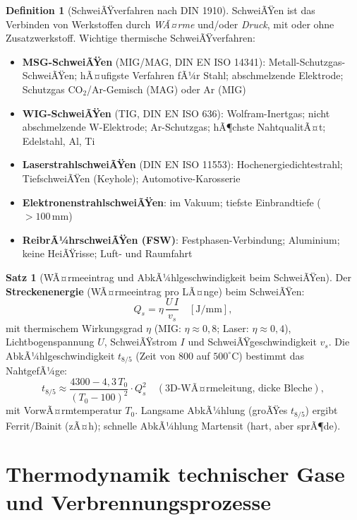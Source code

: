 ﻿\documentclass[a4paper,12pt]{report}
\theoremstyle{definition}
\newtheorem{definition}{Definition}
\newtheorem{satz}{Satz}
\begin{document}
\begin{definition}[SchweiÃŸverfahren nach DIN 1910]
SchweiÃŸen ist das Verbinden von Werkstoffen durch \emph{WÃ¤rme}
und/oder \emph{Druck}, mit oder ohne Zusatzwerkstoff.
Wichtige thermische SchweiÃŸverfahren:
\begin{itemize}
    \item[-] \textbf{MSG-SchweiÃŸen} (MIG/MAG, DIN EN ISO 14341):
          Metall-Schutzgas-SchweiÃŸen; hÃ¤ufigste Verfahren fÃ¼r Stahl;
          abschmelzende Elektrode; Schutzgas CO$_2$/Ar-Gemisch (MAG) oder Ar (MIG)
    \item[-] \textbf{WIG-SchweiÃŸen} (TIG, DIN EN ISO 636):
          Wolfram-Inertgas; nicht abschmelzende W-Elektrode; Ar-Schutzgas;
          hÃ¶chste NahtqualitÃ¤t; Edelstahl, Al, Ti
    \item[-] \textbf{LaserstrahlschweiÃŸen} (DIN EN ISO 11553):
          Hochenergiedichtestrahl; TiefschweiÃŸen (Keyhole); Automotive-Karosserie
    \item[-] \textbf{ElektronenstrahlschweiÃŸen}: im Vakuum; tiefste Einbrandtiefe ($> 100\,\mathrm{mm}$)
    \item[-] \textbf{ReibrÃ¼hrschweiÃŸen (FSW)}: Festphasen-Verbindung;
          Aluminium; keine HeiÃŸrisse; Luft- und Raumfahrt
\end{itemize}
\end{definition}

\begin{satz}[WÃ¤rmeeintrag und AbkÃ¼hlgeschwindigkeit beim SchweiÃŸen]
Der \textbf{Streckenenergie} (WÃ¤rmeeintrag pro LÃ¤nge) beim SchweiÃŸen:
\[
  Q_s = \eta\,\frac{U\,I}{v_s} \quad [\mathrm{J/mm}],
\]
mit thermischem Wirkungsgrad $\eta$ (MIG: $\eta \approx 0{,}8$;
Laser: $\eta \approx 0{,}4$), Lichtbogenspannung $U$, SchweiÃŸstrom $I$
und SchweiÃŸgeschwindigkeit $v_s$.
Die AbkÃ¼hlgeschwindigkeit $t_{8/5}$ (Zeit von $800$ auf $500^\circ\mathrm{C}$)
bestimmt das NahtgefÃ¼ge:
\[
  t_{8/5} \approx \frac{4300 - 4{,}3\,T_0}{(T_0 - 100)^2}\cdot Q_s^2
  \quad (\text{3D-WÃ¤rmeleitung, dicke Bleche}),
\]
mit VorwÃ¤rmtemperatur $T_0$. Langsame AbkÃ¼hlung (groÃŸes $t_{8/5}$) ergibt
Ferrit/Bainit (zÃ¤h); schnelle AbkÃ¼hlung Martensit (hart, aber sprÃ¶de).
\end{satz}



\section{Thermodynamik technischer Gase und Verbrennungsprozesse}
\end{document}
